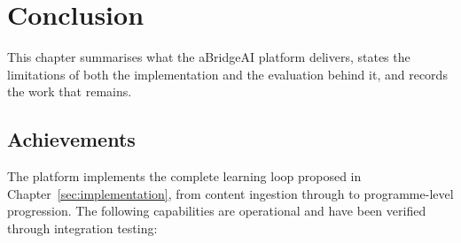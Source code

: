 ﻿\section{Conclusion}

This chapter summarises what the aBridgeAI platform delivers, states the limitations of both the implementation and the evaluation behind it, and records the work that remains.

\subsection{Achievements}

The platform implements the complete learning loop proposed in Chapter~\ref{sec:implementation}, from content ingestion through to programme-level progression. The following capabilities are operational and have been verified through integration testing:


